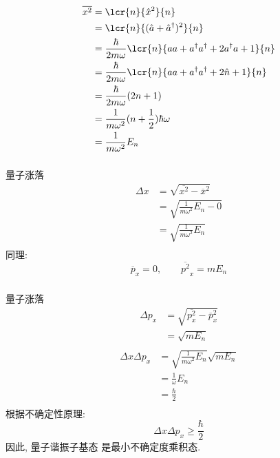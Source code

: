    \begin{frame}
   \[\begin{aligned}
       \overline{x^2} & = \lcr{n}{\hat{x}^2}{n} \\ 
       &=  \lcr{n}{ (\hat{a}+ \hat{a}^\dagger)^2}{n} \\ 
       &= \frac{\hbar}{2m\omega} \lcr{n}{ aa + {a}^\dagger {a}^\dagger + 2{a}^\dagger a + 1}{n} \\ 
       &= \frac{\hbar}{2m\omega} \lcr{n}{ aa + {a}^\dagger {a}^\dagger + 2 \hat{n} + 1}{n} \\ 
       &= \frac{\hbar}{2m\omega} (2n+1)  \\ 
       &= \frac{1}{m\omega^2}  (n+\frac{1}{2})\hbar\omega \\ 
       &= \frac{1}{m\omega^2} E_n
   \end{aligned} \]     
   \end{frame}
   
   \begin{frame}
       \frametitle{}
       量子涨落
       \[\begin{aligned}
           \Delta x  &= \sqrt{ \overline{x^2}- \overline{x}^2}  \\ 
           &= \sqrt{ \frac{1}{m\omega^2} E_n- 0}  \\ 
           &= \sqrt{ \frac{1}{m\omega^2} E_n}  \\ 
       \end{aligned} \]
        同理:
    \[\overline{p}_x =0, \qquad \overline{p^2}_x = m E_n\]
   \end{frame}
   
   \begin{frame}
    \frametitle{}

         量子涨落
         \[\begin{aligned}
           \Delta p_x  &= \sqrt{ \overline{p^2 _x}- \overline{p}_x ^2}  \\ 
             &= \sqrt{ m E_n}  \\ 
         \end{aligned} \]
         \[\begin{aligned}
           \Delta x \Delta p_x  &= \sqrt{ \frac{1}{m\omega^2} E_n} \sqrt{ m E_n} \\ 
           &= \frac{1}{\omega} E_n \\ 
           &= \frac{\hbar}{2}  \\
         \end{aligned} \]
         根据不确定性原理: 
         \[ \Delta x \Delta p_x \geq  \frac{\hbar}{2}  \]
         因此, 量子谐振子基态 是最小不确定度乘积态.
   \end{frame}

